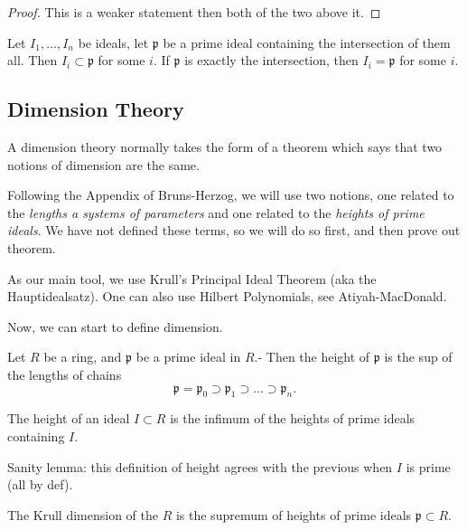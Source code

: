 \begin{proof}
    This is a weaker statement then both of the two above it.
\end{proof}

\begin{lemma}
    Let \(I_{1}, \ldots, I_{n}\) be ideals, let \(\mathfrak{p}\) be a
    prime ideal containing the intersection of them all.
    Then \(I_{i} \subset \mathfrak{p}\) for some \(i\).
    If \(\mathfrak{p}\) is exactly the intersection, then
    \(I_{i} = \mathfrak{p}\) for some \(i\).
\end{lemma}

\subsection{Dimension Theory}

A dimension theory normally takes the form of 
a theorem which says that two notions of dimension
are the same. 

Following the Appendix of Bruns-Herzog, we will use two 
notions, one related to the
\textit{lengths a systems of parameters} and one 
related to the \textit{heights of prime ideals}. 
We have not defined these terms, so we will do so first, and then
prove out theorem.

As our main tool, we use Krull's Principal Ideal Theorem
(aka the Hauptidealsatz). 
One can also use Hilbert Polynomials, see Atiyah-MacDonald.


Now, we can start to define dimension.

\begin{definition}
  \label{def:Ideal.primeHeight}
  \leanok
  Let $R$ be a ring, and $\mathfrak{p}$
  be a prime ideal in $R$.-
  Then the height of $\mathfrak{p}$ is the sup of
  the lengths of chains
  \[
    \mathfrak{p} = \mathfrak{p}_0 \supset \mathfrak{p}_1 \supset \dots \supset \mathfrak{p}_n
   . \]
\end{definition}

\begin{definition}
    \label{def:Ideal.height}
    \leanok
    The height of an ideal \(I \subset R\)
    is the infimum of the heights of
    prime ideals containing \(I\).
\end{definition}
    
Sanity lemma: this definition of height agrees
with the previous when \(I\) is prime (all by def).

\begin{definition}
    \label{def:krull_dim_ring}
    The Krull dimension of the \(R\)
    is the supremum of heights of prime
    ideals \(\mathfrak{p} \subset R\).
\end{definition}
    
